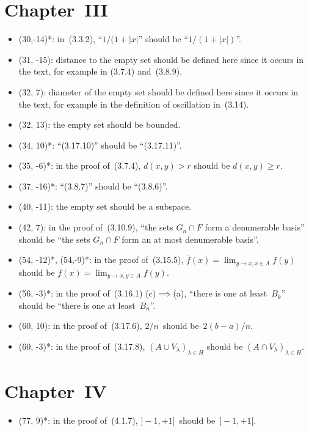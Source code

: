 \documentclass[letterpaper,12pt]{article}
\newcommand{\union}{\cup}
\newcommand{\sect}{\cap}
\newcommand{\abs}[1]{|{#1}|}
\begin{document}
\section*{Chapter~III}
\begin{itemize}
\item (30,-14)*: in~(3.3.2), ``\(1/(1+\abs{x}\)'' should be ``\(1/(1+\abs{x})\)''.
\item (31, -15): distance to the empty set should be defined here since it occurs in the text, for example in (3.7.4) and~(3.8.9).
\item (32, 7): diameter of the empty set should be defined here since it occurs in the text, for example in the definition of oscillation in~(3.14).
\item (32, 13): the empty set should be bounded.
\item (34, 10)*: ``(3.17.10)'' should be ``(3.17.11)''.
\item (35, -6)*: in the proof of~(3.7.4), \(d(x,y)>r\) should be \(d(x,y)\ge r\).
\item (37, -16)*: ``(3.8.7)'' should be ``(3.8.6)''.
\item (40, -11): the empty set should be a subspace.
\item (42, 7): in the proof of~(3.10.9), ``the sets \(G_n\sect F\) form a denumerable basis'' should be ``the sets \(G_n\sect F\) form an at most denumerable basis''.
\item (54, -12)*, (54,-9)*: in the proof of~(3.15.5), \(\overline{f}(x)=\lim_{y\to x,x\in A}f(y)\) should be \(\overline{f}(x)=\lim_{y\to x,y\in A}f(y)\).
\item (56, -3)*: in the proof of~(3.16.1) (c)\(\implies\)(a), ``there is one at least~\(B_k\)'' should be ``there is one at least~\(B_n\)''.
\item (60, 10): in the proof of~(3.17.6), \(2/n\)~should be~\(2(b-a)/n\).
\item (60, -3)*: in the proof of~(3.17.8), \((A\union V_{\lambda})_{\lambda\in H}\) should be \((A\sect V_{\lambda})_{\lambda\in H}\).
\end{itemize}

\section*{Chapter~IV}
\begin{itemize}
\item (77, 9)*: in the proof of~(4.1.7), \(]-1,+1]\)~should be~\(]-1,+1[\).
\end{itemize}
\end{document}
